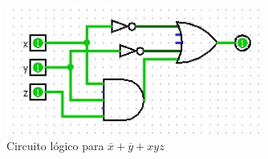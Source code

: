 \begin{figure}[hbt!]
    \centering
    \includegraphics[width=0.75\textwidth]{recursos/Ejercicio2/circuito_d.png}
    \caption{Circuito lógico para $\overline{x} + \overline{y} + xyz$}
\end{figure}



